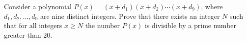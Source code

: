 Consider a polynomial $P(x) = (x + d_1)(x + d_2) \cdots (x + d_9)$, where $d_1, d_2, \ldots, d_9$ are nine distinct integers. Prove that there exists an integer $N$ such that for all integers $x \geq N$ the number $P(x)$ is divisible by a prime number greater than $20$.
